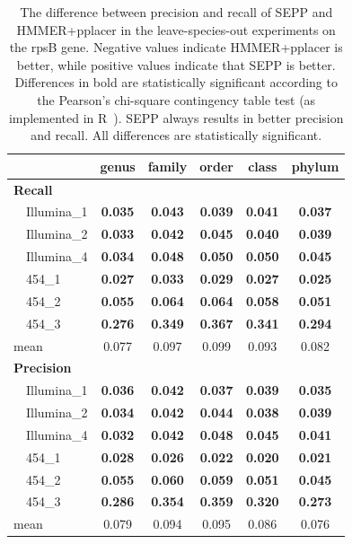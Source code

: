 \begin{table}[hptb]
\caption[Precision-Recall Differences between SEPP and HMMER+pplacer on the rpsB gene]{\label{tipp:difference.leaveout.rspb.pplacer.sepp}
The difference between precision and recall of SEPP and HMMER+pplacer in the leave-species-out experiments on the rpsB gene. 
Negative values indicate HMMER+pplacer is better, while positive values indicate that SEPP is better.
Differences in bold are statistically significant according to the Pearson's chi-square contingency table test (as implemented in R~\cite{R}). 
SEPP always results in better precision and recall. All differences are statistically significant.
}
\begin{center}
\begin{tabular}{|l||c|c|c|c|c|} \hline
\multicolumn{1}{|l||}{}&\multicolumn{1}{c|}{genus}&\multicolumn{1}{c|}{family}&\multicolumn{1}{c|}{order}&\multicolumn{1}{c|}{class}&\multicolumn{1}{c|}{phylum}\\ \hline
{\bf Recall}&&&&&\\
~~Illumina\_1&{\bf 0.035}&{\bf 0.043}&{\bf 0.039}&{\bf 0.041}&{\bf 0.037}\\ 
~~Illumina\_2&{\bf 0.033}&{\bf 0.042}&{\bf 0.045}&{\bf 0.040}&{\bf 0.039}\\ 
~~Illumina\_4&{\bf 0.034}&{\bf 0.048}&{\bf 0.050}&{\bf 0.050}&{\bf 0.045}\\ 
~~454\_1&{\bf 0.027}&{\bf 0.033}&{\bf 0.029}&{\bf 0.027}&{\bf 0.025}\\ 
~~454\_2&{\bf 0.055}&{\bf 0.064}&{\bf 0.064}&{\bf 0.058}&{\bf 0.051}\\ 
~~454\_3&{\bf 0.276}&{\bf 0.349}&{\bf 0.367}&{\bf 0.341}&{\bf 0.294}\\
mean& 0.077& 0.097& 0.099& 0.093& 0.082\\ 
\hline
{\bf Precision}&&&&&\\
~~Illumina\_1&{\bf 0.036}&{\bf 0.042}&{\bf 0.037}&{\bf 0.039}&{\bf 0.035}\\ 
~~Illumina\_2&{\bf 0.034}&{\bf 0.042}&{\bf 0.044}&{\bf 0.038}&{\bf 0.039}\\ 
~~Illumina\_4&{\bf 0.032}&{\bf 0.042}&{\bf 0.048}&{\bf 0.045}&{\bf 0.041}\\ 
~~454\_1&{\bf 0.028}&{\bf 0.026}&{\bf 0.022}&{\bf 0.020}&{\bf 0.021}\\ 
~~454\_2&{\bf 0.055}&{\bf 0.060}&{\bf 0.059}&{\bf 0.051}&{\bf 0.045}\\ 
~~454\_3&{\bf 0.286}&{\bf 0.354}&{\bf 0.359}&{\bf 0.320}&{\bf 0.273}\\ 
mean&0.079&0.094&0.095&0.086&0.076\\ 
\hline
\end{tabular}
\end{center}
\end{table}

